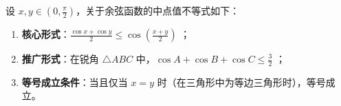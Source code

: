 \begin{statementbox}
设 $x, y \in \left(0, \frac{\pi}{2}\right)$，关于余弦函数的中点值不等式如下：
\begin{enumerate}
    \item \textbf{核心形式}：$\frac{\cos x + \cos y}{2} \leqslant \cos\left(\frac{x+y}{2}\right)$ ；
    \item \textbf{推广形式}：在锐角 $\triangle ABC$ 中，$\cos A + \cos B + \cos C \leqslant \frac{3}{2}$ ；
    \item \textbf{等号成立条件}：当且仅当 $x = y$ 时（在三角形中为等边三角形时），等号成立。
\end{enumerate}
\end{statementbox}
